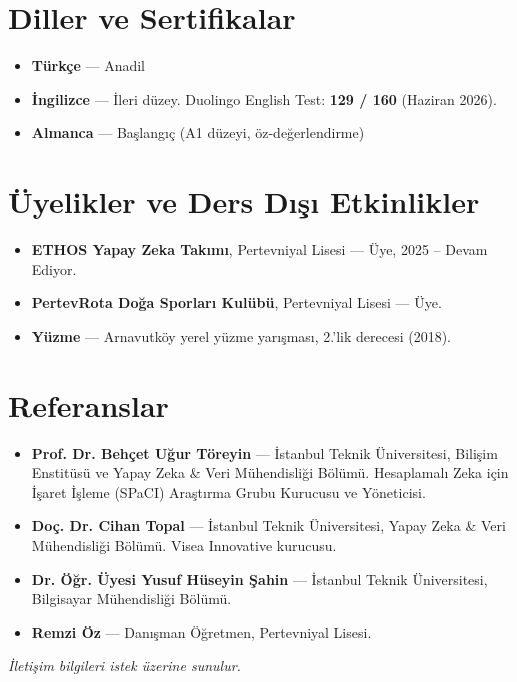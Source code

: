 \documentclass[11pt,a4paper]{article}
\begin{document}
\section*{Diller ve Sertifikalar}
\begin{itemize}
    \item \textbf{Türkçe} --- Anadil
    \item \textbf{İngilizce} --- İleri düzey. Duolingo English Test: \textbf{129 / 160} (Haziran 2026).
    \item \textbf{Almanca} --- Başlangıç (A1 düzeyi, öz-değerlendirme)
\end{itemize}

\section*{Üyelikler ve Ders Dışı Etkinlikler}
\begin{itemize}
    \item \textbf{ETHOS Yapay Zeka Takımı}, Pertevniyal Lisesi --- Üye, 2025 -- Devam Ediyor.
    \item \textbf{PertevRota Doğa Sporları Kulübü}, Pertevniyal Lisesi --- Üye.
    \item \textbf{Yüzme} --- Arnavutköy yerel yüzme yarışması, 2.'lik derecesi (2018).
\end{itemize}

\section*{Referanslar}
\begin{itemize}
    \item \textbf{Prof. Dr. Behçet Uğur Töreyin} --- İstanbul Teknik Üniversitesi, Bilişim Enstitüsü ve Yapay Zeka \& Veri Mühendisliği Bölümü. Hesaplamalı Zeka için İşaret İşleme (SPaCI) Araştırma Grubu Kurucusu ve Yöneticisi.
    \item \textbf{Doç. Dr. Cihan Topal} --- İstanbul Teknik Üniversitesi, Yapay Zeka \& Veri Mühendisliği Bölümü. Visea Innovative kurucusu.
    \item \textbf{Dr. Öğr. Üyesi Yusuf Hüseyin Şahin} --- İstanbul Teknik Üniversitesi, Bilgisayar Mühendisliği Bölümü.
    \item \textbf{Remzi Öz} --- Danışman Öğretmen, Pertevniyal Lisesi.
\end{itemize}

\vspace{0.3em}
\textit{İletişim bilgileri istek üzerine sunulur.}
\end{document}
